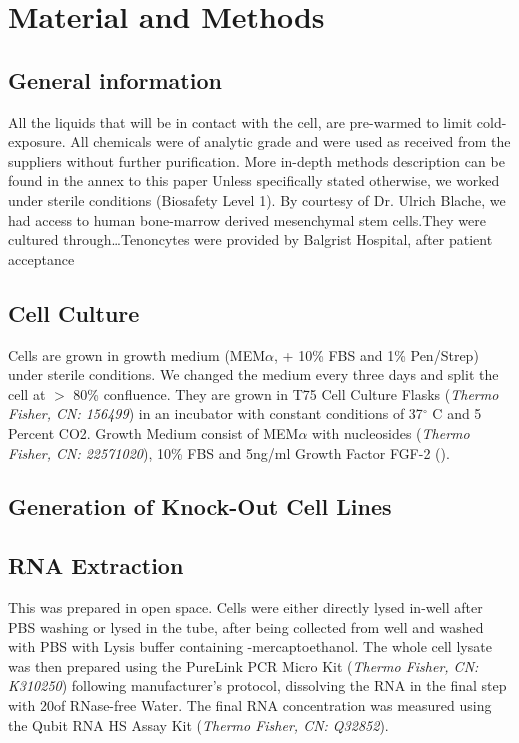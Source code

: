 \renewcommand{\package}{\emph}
\newcommand{\product}{\textit}

\chapter{Material and Methods}

\section{General information}
All the liquids that will be in contact with the cell, are pre-warmed to limit cold-exposure. All chemicals were of analytic grade and were used as received from the suppliers without further purification. 
More in-depth methods description can be found in the annex to this paper 
Unless specifically stated otherwise, we worked under sterile conditions (Biosafety Level 1). 
By courtesy of Dr. Ulrich Blache, we had access to human bone-marrow derived mesenchymal stem cells.They were cultured through\ldots Tenoncytes were provided by Balgrist Hospital, after patient acceptance

\section{Cell Culture}

Cells are grown in growth medium (MEM$\alpha$, + 10\% FBS and 1\% Pen/Strep) under sterile conditions. We changed the medium every three days and split the cell at $>$ 80\% confluence. 
They are grown in T75 Cell Culture Flasks (\product{Thermo Fisher, CN: 156499}) in an incubator with constant conditions of 37$^{\circ}$ C and 5 Percent CO2. Growth Medium consist of MEM$\alpha$ with nucleosides (\product{Thermo Fisher, CN: 22571020}), 10\% FBS and 5ng/ml Growth Factor FGF-2 ().

\section{Generation of Knock-Out Cell Lines}

\section{RNA Extraction}
This was prepared in open space. 
Cells were either directly lysed in-well after PBS washing or lysed in the tube, after being collected from well and washed with PBS with Lysis buffer containing \textbeta-mercaptoethanol. The whole cell lysate was then prepared using the PureLink PCR Micro Kit (\product{Thermo Fisher, CN: K310250}) following manufacturer's protocol, dissolving the RNA in the final step with 20\mul of RNase-free Water. The final RNA concentration was measured using the Qubit RNA HS Assay Kit (\product{Thermo Fisher, CN: Q32852}). 

